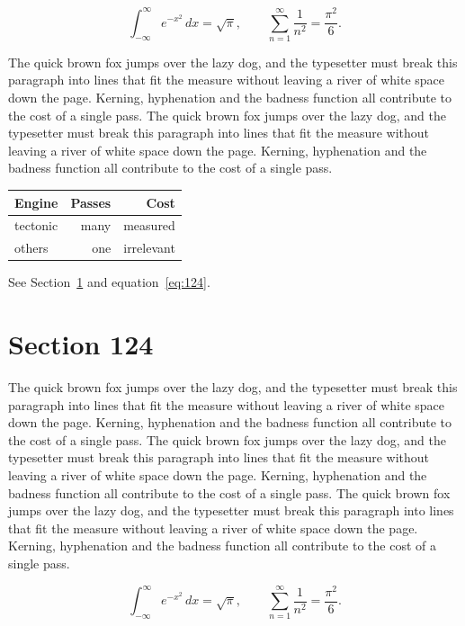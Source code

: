 \documentclass{article}
\begin{document}
\begin{equation}\label{eq:123}
\int_{-\infty}^{\infty} e^{-x^{2}}\,dx = \sqrt{\pi}, \qquad
\sum_{n=1}^{\infty} \frac{1}{n^{2}} = \frac{\pi^{2}}{6}.
\end{equation}

The quick brown fox jumps over the lazy dog, and the typesetter must break this paragraph into lines that fit the measure without leaving a river of white space down the page. Kerning, hyphenation and the badness function all contribute to the cost of a single pass. The quick brown fox jumps over the lazy dog, and the typesetter must break this paragraph into lines that fit the measure without leaving a river of white space down the page. Kerning, hyphenation and the badness function all contribute to the cost of a single pass. 

\begin{center}
\begin{tabular}{lrr}
\toprule
Engine & Passes & Cost \\
\midrule
tectonic & many & measured \\
others & one & irrelevant \\
\bottomrule
\end{tabular}
\end{center}

See Section~\ref{sec:124} and equation~\eqref{eq:124}.
\section{Section 124}
\label{sec:124}
The quick brown fox jumps over the lazy dog, and the typesetter must break this paragraph into lines that fit the measure without leaving a river of white space down the page. Kerning, hyphenation and the badness function all contribute to the cost of a single pass. The quick brown fox jumps over the lazy dog, and the typesetter must break this paragraph into lines that fit the measure without leaving a river of white space down the page. Kerning, hyphenation and the badness function all contribute to the cost of a single pass. The quick brown fox jumps over the lazy dog, and the typesetter must break this paragraph into lines that fit the measure without leaving a river of white space down the page. Kerning, hyphenation and the badness function all contribute to the cost of a single pass. 

\begin{equation}\label{eq:124}
\int_{-\infty}^{\infty} e^{-x^{2}}\,dx = \sqrt{\pi}, \qquad
\sum_{n=1}^{\infty} \frac{1}{n^{2}} = \frac{\pi^{2}}{6}.
\end{equation}
\end{document}
